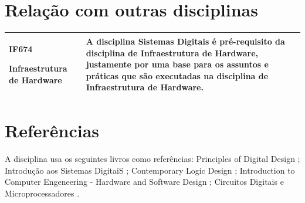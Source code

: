 \documentclass[10pt]{article}
\begin{document}
\section{Relação com outras disciplinas}
\begin{table}[h]
 \centering
 {\renewcommand\arraystretch{1.25}
 \begin{tabular}{ l l }
  \cline{1-1}\cline{2-2}  
    \multicolumn{1}{|p{5cm}|}{\begin{center}IF674
\end{center}  			


\begin{center}Infraestrutura de Hardware
\end{center}} &
    \multicolumn{1}{p{5cm}|}{ A disciplina Sistemas Digitais é pré-requisito da disciplina de Infraestrutura de Hardware, justamente por uma base para os assuntos e práticas que são executadas na disciplina de Infraestrutura de Hardware.}
  \\  
  \hline

 \end{tabular} }
\end{table}
\section{Referências}
A disciplina usa os seguintes livros como referências: Principles of Digital Design \cite{livro1}; Introdução aos Sistemas DigitaiS \cite{livro2}; Contemporary Logic Design \cite{livro3} ;  Introduction to Computer Engeneering - Hardware and Software Design \cite{livro4}; Circuitos Digitais e Microprocessadores \cite{livro5}.


\end{document}
